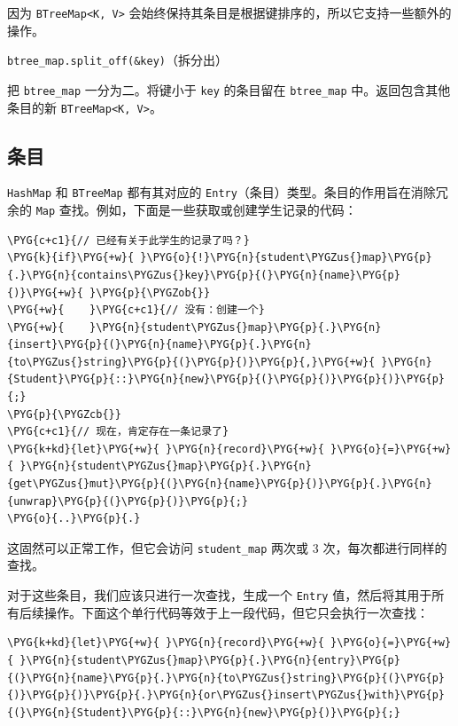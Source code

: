 因为 \texttt{BTreeMap<K, V>} 会始终保持其条目是根据键排序的，所以它支持一些额外的操作。

\begin{myNote}
\texttt{btree\_map.split\_off(\&key)}（拆分出）
\end{myNote}

把 \texttt{btree\_map} 一分为二。将键小于 \texttt{key} 的条目留在 \texttt{btree\_map} 中。返回包含其他条目的新 \texttt{BTreeMap<K, V>}。

\subsection{条目}

\texttt{HashMap} 和 \texttt{BTreeMap} 都有其对应的 \texttt{Entry}（条目）类型。条目的作用旨在消除冗余的 \texttt{Map} 查找。例如，下面是一些获取或创建学生记录的代码：

\begin{Verbatim}[commandchars=\\\{\},breaklines=true,breakanywhere=true,fontsize=\codefont,xleftmargin=17bp]
\PYG{c+c1}{// 已经有关于此学生的记录了吗？}
\PYG{k}{if}\PYG{+w}{ }\PYG{o}{!}\PYG{n}{student\PYGZus{}map}\PYG{p}{.}\PYG{n}{contains\PYGZus{}key}\PYG{p}{(}\PYG{n}{name}\PYG{p}{)}\PYG{+w}{ }\PYG{p}{\PYGZob{}}
\PYG{+w}{    }\PYG{c+c1}{// 没有：创建一个}
\PYG{+w}{    }\PYG{n}{student\PYGZus{}map}\PYG{p}{.}\PYG{n}{insert}\PYG{p}{(}\PYG{n}{name}\PYG{p}{.}\PYG{n}{to\PYGZus{}string}\PYG{p}{(}\PYG{p}{)}\PYG{p}{,}\PYG{+w}{ }\PYG{n}{Student}\PYG{p}{::}\PYG{n}{new}\PYG{p}{(}\PYG{p}{)}\PYG{p}{)}\PYG{p}{;}
\PYG{p}{\PYGZcb{}}
\PYG{c+c1}{// 现在，肯定存在一条记录了}
\PYG{k+kd}{let}\PYG{+w}{ }\PYG{n}{record}\PYG{+w}{ }\PYG{o}{=}\PYG{+w}{ }\PYG{n}{student\PYGZus{}map}\PYG{p}{.}\PYG{n}{get\PYGZus{}mut}\PYG{p}{(}\PYG{n}{name}\PYG{p}{)}\PYG{p}{.}\PYG{n}{unwrap}\PYG{p}{(}\PYG{p}{)}\PYG{p}{;}
\PYG{o}{..}\PYG{p}{.}
\end{Verbatim}

这固然可以正常工作，但它会访问 \texttt{student\_map} 两次或 3 次，每次都进行同样的查找。

对于这些条目，我们应该只进行一次查找，生成一个 \texttt{Entry} 值，然后将其用于所有后续操作。下面这个单行代码等效于上一段代码，但它只会执行一次查找：

\begin{Verbatim}[commandchars=\\\{\},breaklines=true,breakanywhere=true,fontsize=\codefont,xleftmargin=17bp]
\PYG{k+kd}{let}\PYG{+w}{ }\PYG{n}{record}\PYG{+w}{ }\PYG{o}{=}\PYG{+w}{ }\PYG{n}{student\PYGZus{}map}\PYG{p}{.}\PYG{n}{entry}\PYG{p}{(}\PYG{n}{name}\PYG{p}{.}\PYG{n}{to\PYGZus{}string}\PYG{p}{(}\PYG{p}{)}\PYG{p}{)}\PYG{p}{.}\PYG{n}{or\PYGZus{}insert\PYGZus{}with}\PYG{p}{(}\PYG{n}{Student}\PYG{p}{::}\PYG{n}{new}\PYG{p}{)}\PYG{p}{;}
\end{Verbatim}

